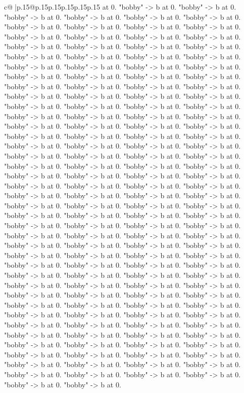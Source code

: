 \documentclass{article}
\begin{document}
{\begin{supertabular}{c@{$\;$}|p{.15\linewidth}@{}p{.15\linewidth}p{.15\linewidth}p{.15\linewidth}p{.15\linewidth}p{.15\linewidth}}
{{{at 0. "bobby" {-}> b at 0. "bobby" {-}> b at 0. "bobby" {-}> b at 0. "bobby" {-}> b at 0. "bobby" {-}> b at 0. "bobby" {-}> b at 0. "bobby" {-}> b at 0. "bobby" {-}> b at 0. "bobby" {-}> b at 0. "bobby" {-}> b at 0. "bobby" {-}> b at 0. "bobby" {-}> b at 0. "bobby" {-}> b at 0. "bobby" {-}> b at 0. "bobby" {-}> b at 0. "bobby" {-}> b at 0. "bobby" {-}> b at 0. "bobby" {-}> b at 0. "bobby" {-}> b at 0. "bobby" {-}> b at 0. "bobby" {-}> b at 0. "bobby" {-}> b at 0. "bobby" {-}> b at 0. "bobby" {-}> b at 0. "bobby" {-}> b at 0. "bobby" {-}> b at 0. "bobby" {-}> b at 0. "bobby" {-}> b at 0. "bobby" {-}> b at 0. "bobby" {-}> b at 0. "bobby" {-}> b at 0. "bobby" {-}> b at 0. "bobby" {-}> b at 0. "bobby" {-}> b at 0. "bobby" {-}> b at 0. "bobby" {-}> b at 0. "bobby" {-}> b at 0. "bobby" {-}> b at 0. "bobby" {-}> b at 0. "bobby" {-}> b at 0. "bobby" {-}> b at 0. "bobby" {-}> b at 0. "bobby" {-}> b at 0. "bobby" {-}> b at 0. "bobby" {-}> b at 0. "bobby" {-}> b at 0. "bobby" {-}> b at 0. "bobby" {-}> b at 0. "bobby" {-}> b at 0. "bobby" {-}> b at 0. "bobby" {-}> b at 0. "bobby" {-}> b at 0. "bobby" {-}> b at 0. "bobby" {-}> b at 0. "bobby" {-}> b at 0. "bobby" {-}> b at 0. "bobby" {-}> b at 0. "bobby" {-}> b at 0. "bobby" {-}> b at 0. "bobby" {-}> b at 0. "bobby" {-}> b at 0. "bobby" {-}> b at 0. "bobby" {-}> b at 0. "bobby" {-}> b at 0. "bobby" {-}> b at 0. "bobby" {-}> b at 0. "bobby" {-}> b at 0. "bobby" {-}> b at 0. "bobby" {-}> b at 0. "bobby" {-}> b at 0. "bobby" {-}> b at 0. "bobby" {-}> b at 0. "bobby" {-}> b at 0. "bobby" {-}> b at 0. "bobby" {-}> b at 0. "bobby" {-}> b at 0. "bobby" {-}> b at 0. "bobby" {-}> b at 0. "bobby" {-}> b at 0. "bobby" {-}> b at 0. "bobby" {-}> b at 0. "bobby" {-}> b at 0. "bobby" {-}> b at 0. "bobby" {-}> b at 0. "bobby" {-}> b at 0. "bobby" {-}> b at 0. "bobby" {-}> b at 0. "bobby" {-}> b at 0. "bobby" {-}> b at 0. "bobby" {-}> b at 0. "bobby" {-}> b at 0. "bobby" {-}> b at 0. "bobby" {-}> b at 0. "bobby" {-}> b at 0. "bobby" {-}> b at 0. "bobby" {-}> b at 0. "bobby" {-}> b at 0. "bobby" {-}> b at 0. "bobby" {-}> b at 0. "bobby" {-}> b at 0. "bobby" {-}> b at 0. "bobby" {-}> b at 0. "bobby" {-}> b at 0. "bobby" {-}> b at 0. "bobby" {-}> b at 0. "bobby" {-}> b at 0. "bobby" {-}> b at 0. "bobby" {-}> b at 0. "bobby" {-}> b at 0. "bobby" {-}> b at 0. "bobby" {-}> b at 0. "bobby" {-}> b at 0. "bobby" {-}> b at 0. "bobby" {-}> b at 0. "bobby" {-}> b at 0. "bobby" {-}> b at 0. "bobby" {-}> b at 0. "bobby" {-}> b at 0. "bobby" {-}> b at 0. "bobby" {-}> b at 0. "bobby" {-}> b at 0. "bobby" {-}> b at 0. "bobby" {-}> b at 0. "bobby" {-}> b at 0. "bobby" {-}> b at 0. "bobby" {-}> b at 0. "bobby" {-}> b at 0. "bobby" {-}> b at 0. "bobby" {-}> b at 0. "bobby" {-}> b at 0. "bobby" {-}> b at 0. "bobby" {-}> b at 0. "bobby" {-}> b at 0. "bobby" {-}> b at 0. "bobby" {-}> b at 0. "bobby" {-}> b at 0. "bobby" {-}> b at 0. "bobby" {-}> b at 0. "bobby" {-}> b at 0. "bobby" {-}> b at 0. "bobby" {-}> b at 0. "bobby" {-}> b at 0. "bobby" {-}> b at 0. "bobby" {-}> b at 0. "bobby" {-}> b at 0. "bobby" {-}> b at 0. "bobby" {-}> b at 0. "bobby" {-}> b at 0. "bobby" {-}> b at 0. "bobby" {-}> b at 0. "bobby" {-}> b at 0. "bobby" {-}> b at 0. }}}
\end{supertabular}}
\end{document}

